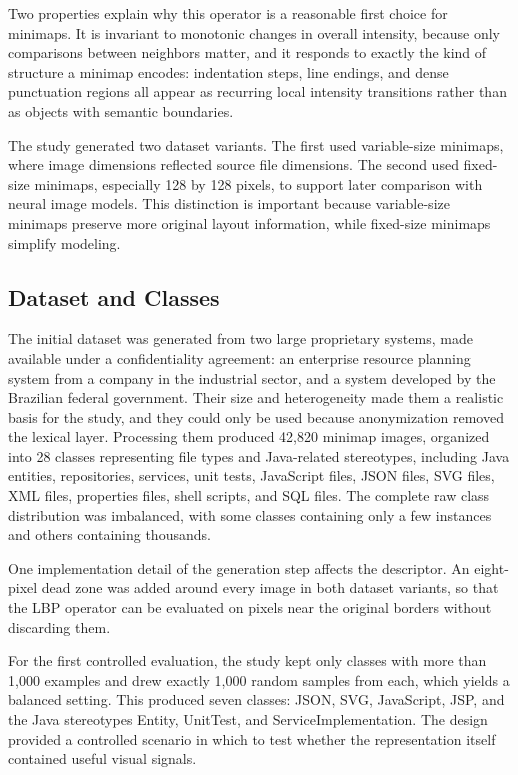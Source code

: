 Two properties explain why this operator is a reasonable first choice for
minimaps. It is invariant to monotonic changes in overall intensity, because
only comparisons between neighbors matter, and it responds to exactly the kind
of structure a minimap encodes: indentation steps, line endings, and dense
punctuation regions all appear as recurring local intensity transitions rather
than as objects with semantic boundaries.

The study generated two dataset variants. The first used variable-size minimaps,
where image dimensions reflected source file dimensions. The second used
fixed-size minimaps, especially 128 by 128 pixels, to support later comparison
with neural image models. This distinction is important because variable-size
minimaps preserve more original layout information, while fixed-size minimaps
simplify modeling.

\subsection{Dataset and Classes}

The initial dataset was generated from two large proprietary systems, made
available under a confidentiality agreement: an enterprise resource planning
system from a company in the industrial sector, and a system developed by the
Brazilian federal government. Their size and heterogeneity made them a realistic
basis for the study, and they could only be used because anonymization removed
the lexical layer. Processing them produced 42,820 minimap images, organized into 28
classes representing file types and Java-related stereotypes, including Java
entities, repositories, services, unit tests, JavaScript files, JSON files, SVG
files, XML files, properties files, shell scripts, and SQL files. The complete
raw class distribution was imbalanced, with some classes containing only a few
instances and others containing thousands.

One implementation detail of the generation step affects the descriptor. An
eight-pixel dead zone was added around every image in both dataset variants, so
that the LBP operator can be evaluated on pixels near the original borders
without discarding them.

For the first controlled evaluation, the study kept only classes with more than
1,000 examples and drew exactly 1,000 random samples from each, which yields a
balanced setting. This produced seven classes: JSON, SVG, JavaScript, JSP, and
the Java stereotypes Entity, UnitTest, and ServiceImplementation. The design
provided a controlled scenario in which to test whether the representation
itself contained useful visual signals.

